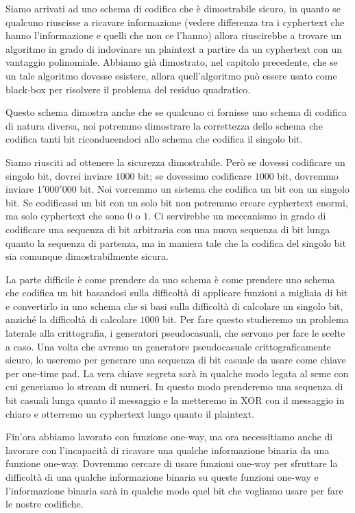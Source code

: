 \noindent Siamo arrivati ad uno schema di codifica che è dimostrabile sicuro, in quanto se qualcuno riuscisse a ricavare informazione (vedere differenza tra i cyphertext che hanno l'informazione e quelli che non ce l'hanno) allora riuscirebbe a trovare un algoritmo in grado di indovinare un plaintext a partire da un cyphertext con un vantaggio polinomiale. Abbiamo già dimostrato, nel capitolo precedente, che se un tale algoritmo dovesse esistere, allora quell'algoritmo può essere usato come black-box per risolvere il problema del residuo quadratico. 

Questo schema dimostra anche che se qualcuno ci fornisse uno schema di codifica di natura diversa, noi potremmo dimostrare la correttezza dello schema che codifica tanti bit riconducendoci allo schema che codifica il singolo bit. 

Siamo riusciti ad ottenere la sicurezza dimostrabile. Però se dovessi codificare un singolo bit, dovrei inviare $1000$ bit; se dovessimo codificare $1000$ bit, dovremmo inviare $1'000'000$ bit. Noi vorremmo un sistema che codifica un bit con un singolo bit. Se codificassi un bit con un solo bit non potremmo creare cyphertext enormi, ma solo cyphertext che sono $0$ o $1$. Ci servirebbe un meccanismo in grado di codificare una sequenza di bit arbitraria con una nuova sequenza di bit lunga quanto la sequenza di partenza, ma in maniera tale che la codifica del singolo bit sia comunque dimostrabilmente sicura. 

La parte difficile è come prendere da uno schema è come prendere uno schema che codifica un bit basandosi sulla difficoltà di applicare funzioni a migliaia di bit e convertirlo in uno schema che si basi sulla difficoltà di calcolare un singolo bit, anziché la difficoltà di calcolare $1000$ bit. Per fare questo studieremo un problema laterale alla crittografia, i generatori pseudocasuali, che servono per fare le scelte a caso. Una volta che avremo un generatore pseudocasuale crittograficamente sicuro, lo useremo per generare una sequenza di bit casuale da usare come chiave per one-time pad. La vera chiave segreta sarà in qualche modo legata al seme con cui generiamo lo stream di numeri. In questo modo prenderemo una sequenza di bit casuali lunga quanto il messaggio e la metteremo in XOR con il messaggio in chiaro e otterremo un cyphertext lungo quanto il plaintext.

Fin'ora abbiamo lavorato con funzione one-way, ma ora necessitiamo anche di lavorare con l'incapacità di ricavare una qualche informazione binaria da una funzione one-way. Dovremmo cercare di usare funzioni one-way per sfruttare la difficoltà di una qualche informazione binaria su queste funzioni one-way e l'informazione binaria sarà in qualche modo quel bit  che vogliamo usare per fare le nostre codifiche.